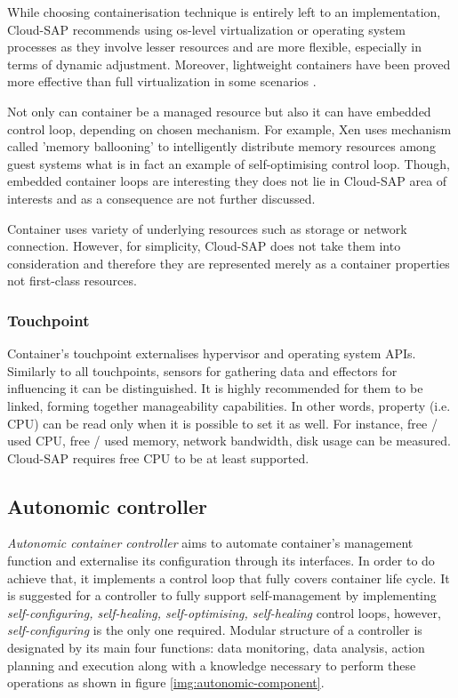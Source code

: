 While choosing containerisation technique is entirely left to an implementation, Cloud-SAP recommends using os-level virtualization or operating system processes as they involve lesser resources and are more flexible, especially in terms of dynamic adjustment. Moreover, lightweight containers have been proved more effective than full virtualization in some scenarios \cite{RaHiSj13}.

Not only can container be a managed resource but also it can have embedded control loop, depending on chosen mechanism. For example, Xen uses mechanism called 'memory ballooning' to intelligently distribute memory resources among guest systems what is in fact an example of self-optimising control loop. Though, embedded container loops are interesting they does not lie in Cloud-SAP area of interests and as a consequence are not further discussed.

Container uses variety of underlying resources such as storage or network connection. However, for simplicity, Cloud-SAP does not take them into consideration and therefore they are represented merely as a container properties not first-class resources.

\subsubsection{Touchpoint}
Container's touchpoint externalises hypervisor and operating system APIs. Similarly to all touchpoints, sensors for gathering data and effectors for influencing it can be distinguished. It is highly recommended for them to be linked, forming together manageability capabilities. In other words, property (i.e. CPU) can be read only when it is possible to set it as well. For instance, free / used CPU, free / used memory, network bandwidth, disk usage can be measured. Cloud-SAP requires free CPU to be at least supported.

\subsection{Autonomic controller}
\emph{Autonomic container controller} aims to automate container's management function and externalise its configuration through its interfaces. In order to do achieve that, it implements a control loop that fully covers container life cycle. It is suggested for a controller to fully support self-management by implementing \emph{self-configuring, self-healing, self-optimising, self-healing} control loops, however, \emph{self-configuring} is the only one required. Modular structure of a controller is designated by its main four functions: data monitoring, data analysis, action planning and execution along with a knowledge necessary to perform these operations as shown in figure \ref{img:autonomic-component}. 

